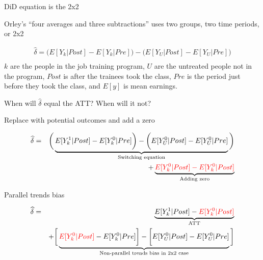 \documentclass{beamer}
\begin{document}
\begin{frame}{DiD equation is the 2x2}

Orley's ``four averages and three subtractions'' uses two groups, two time periods, or 2x2

\begin{eqnarray*}
\widehat{\delta} = \bigg ( E[Y_k|Post] - E[Y_k|Pre] \bigg ) - \bigg ( E[Y_U | Post ] - E[ Y_U | Pre] \bigg) \\
\end{eqnarray*}$k$ are the people in the job training program, $U$ are the untreated people not in the program, $Post$ is after the trainees took the class, $Pre$ is the period just before they took the class, and $E[y]$ is mean earnings. 

\bigskip

When will $\widehat{\delta}$ equal the ATT?  When will it not?

\end{frame}



\begin{frame}{Replace with potential outcomes and add a zero}

\begin{eqnarray*}
\widehat{\delta} &=& \bigg ( \underbrace{E[Y^1_k|Post] - E[Y^0_k|Pre] \bigg ) - \bigg ( E[Y^0_U | Post ] - E[ Y^0_U | Pre]}_{\mathclap{\text{Switching equation}}} \bigg)  \\
&&+ \underbrace{\textcolor{red}{E[Y_k^0 |Post] - E[Y^0_k | Post]}}_{\mathclap{\text{Adding zero}}} 
\end{eqnarray*}

\end{frame}

\begin{frame}{Parallel trends bias}

\begin{eqnarray*}
\widehat{\delta} &=& \underbrace{E[Y^1_k | Post] - \textcolor{red}{E[Y^0_k | Post]}}_{\mathclap{\text{ATT}}} \\
&& + \bigg [  \underbrace{\textcolor{red}{E[Y^0_k | Post]} - E[Y^0_k | Pre] \bigg ] - \bigg [ E[Y^0_U | Post] - E[Y_U^0 | Pre] }_{\mathclap{\text{Non-parallel trends bias in 2x2 case}}} \bigg ]
\end{eqnarray*}


\end{frame}
\end{document}
